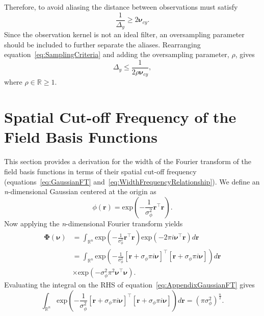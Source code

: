 \documentclass[review,authoryear,3p]{elsarticle}
\begin{document}
Therefore, to avoid aliasing the distance between observations must satisfy
\begin{equation}\label{eq:SamplingCriteria}
	\frac{1}{\Delta_y} \ge 2\boldsymbol{\nu}_{cy}.
\end{equation}
Since the observation kernel is not an ideal filter, an oversampling parameter should be included to further separate the aliases. Rearranging equation~\ref{eq:SamplingCriteria} and adding the oversampling parameter, $\rho$, gives
\begin{equation}\label{ap:Shannon}
	\Delta_y\le\frac{1}{2\rho\boldsymbol{\nu}_{cy}},
\end{equation}
where $\rho \in \mathbb{R} \ge 1$.

\section{Spatial Cut-off Frequency of the Field Basis Functions}\label{App:FrequencyAnalysis}
This section provides a derivation for the width of the Fourier transform of the field basis functions in terms of their spatial cut-off frequency (equations~\ref{eq:GaussianFT} and~\ref{eq:WidthFrequencyRelationship}). We define an \textit{n}-dimensional Gaussian centered at the origin as 
\begin{equation}
 \phi(\mathbf r)=\mathrm{exp}\left(-\frac{1}{\sigma_{\phi}^2}\mathbf r^\top\mathbf r\right).
\end{equation}
Now applying the \textit{n}-dimensional Fourier transform yields
\begin{align}\label{eq:AppendixGaussianFT}
 \boldsymbol\Phi(\boldsymbol \nu)&=\int_{\mathbb{R}^n} {\mathrm{exp}\left({-\frac{1}{\sigma_{\phi}^2}\mathbf r^\top\mathbf r}\right)\mathrm{exp}\left(-2\pi i\boldsymbol\nu^\top\mathbf r\right)d\mathbf r} \nonumber \\
&=\int_{\mathbb{R}^n}\mathrm{exp}\left(-\frac{1}{\sigma_{\phi}^2}\left[\mathbf r +\sigma_{\phi}\pi i \boldsymbol\nu\right]^\top\left[\mathbf r +\sigma_{\phi}\pi i \boldsymbol\nu\right]\right)d\mathbf r \nonumber \\ &\times\mathrm{exp}\left(-\sigma_{\phi}^2\pi^2\boldsymbol\nu^\top \boldsymbol\nu\right).
\end{align}
Evaluating the integral on the RHS of equation~\ref{eq:AppendixGaussianFT} gives 
\begin{equation}\label{eq:IntegralOfGaussian}
\int_{\mathbb{R}^n}\mathrm{exp}\left(-\frac{1}{\sigma_{\phi}^2}\left[\mathbf r +\sigma_{\phi}\pi i \boldsymbol\nu\right]^\top\left[\mathbf r +\sigma_{\phi}\pi i \boldsymbol\nu\right]\right)d\mathbf r
=\left(\pi\sigma_{\phi}^2\right)^{\frac{n}{2}}.
\end{equation}
\end{document}
